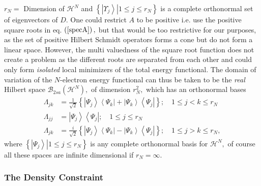 \documentclass[aps,preprint]{revtex4}%
\begin{document}
$r_{N}=$ Dimension of $\mathcal{H}^{N}$ and $\left\{  \left.  \left\vert
\Upsilon_{j}\right\rangle \right\vert 1\leq j\leq r_{N}\right\}  $ is a
complete orthonormal set of eigenvectors of $D$. One could restrict $A$ to be
positive i.e. use the positive square roots in eq. $\left(  \ref{specA}%
\right)  ,$ but that would be too restrictive for our purposes, as the set of
positive Hilbert Schmidt operators forms a cone \cite{Encyclo} but do not form
a linear space. However, the multi valuedness of the square root function does
not create a problem as the different roots are separated from each other and
could only form \emph{isolated} local minimizers of the total energy
functional. The domain of variation of the $N$-electron energy functional can
thus be taken to be the \emph{real} Hilbert space $\mathcal{B}_{2sa}\left(
\mathcal{H}^{N}\right)  ,$ of dimension $r_{N}^{2},$ which has an orthonormal
bases
\begin{align}
\Lambda_{jk}  &  =\frac{1}{\sqrt{2}}\left\{  \left\vert \Psi_{j}\right\rangle
\left\langle \Psi_{k}\right\vert +\left\vert \Psi_{k}\right\rangle
\left\langle \Psi_{j}\right\vert \right\}  ;\quad1\leq j<k\leq r_{N}%
\nonumber\\
\Lambda_{jj}  &  =\left\vert \Psi_{j}\right\rangle \left\langle \Psi
_{j}\right\vert ;\quad1\leq j\leq r_{N}\nonumber\\
\Lambda_{jk}  &  =\frac{i}{\sqrt{2}}\left\{  \left\vert \Psi_{j}\right\rangle
\left\langle \Psi_{k}\right\vert -\left\vert \Psi_{k}\right\rangle
\left\langle \Psi_{j}\right\vert \right\}  ;\quad1\leq j>k\leq r_{N},
\end{align}
where $\left\{  \left.  \left\vert \Psi_{j}\right\rangle \right\vert 1\leq
j\leq r_{N}\right\}  $ is any complete orthonormal basis for $\mathcal{H}%
^{N},$ of course all these spaces are infinite dimensional if $r_{N}=\infty.$

\subsubsection{The Density Constraint\label{DenCon}}
\end{document}
